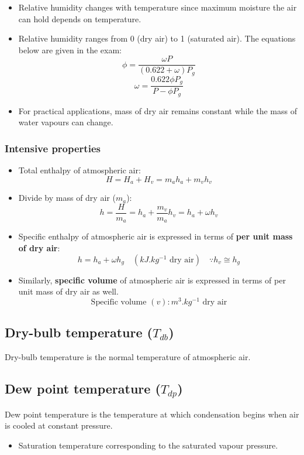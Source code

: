 \documentclass[11pt]{article}
\begin{document}
\begin{itemize}
\item Relative humidity changes with temperature since maximum moisture the air can hold depends on temperature.
\item Relative humidity ranges from 0 (dry air) to 1 (saturated air). The equations below are given in the exam:
\[\phi = \frac{\omega P}{(0.622 + \omega) P_g}\]
\[\omega = \frac{0.622 \phi P_g}{P - \phi P_g}\]
\item For practical applications, mass of dry air remains constant while the mass of water vapours can change.
\end{itemize}
\subsubsection{Intensive properties}
\label{sec:orgef16a56}
\begin{itemize}
\item Total enthalpy of atmospheric air:
\[H = H_a + H_v = m_a h_a + m_v h_v\]
\item Divide by mass of dry air (\(m_a\)):
\[h = \frac{H}{m_a} = h_a + \frac{m_v}{m_a} h_v = h_a + \omega h_v\]
\item Specific enthalpy of atmospheric air is expressed in terms of \textbf{per unit mass of dry air}:
\[h = h_a + \omega h_g \quad (\unit{kJ.kg^{-1}} \text{ dry air}) \quad \because h_v \cong h_g\]
\item Similarly, \textbf{specific volume} of atmospheric air is expressed in terms of per unit mass of dry air as well.
\[\text{Specific volume } (v): \unit{m^3.kg^{-1}} \text{ dry air}\]
\end{itemize}
\subsection{Dry-bulb temperature (\(T_{db}\))}
\label{sec:org8bbe5cf}
Dry-bulb temperature is the normal temperature of atmospheric air.
\subsection{Dew point temperature (\(T_{dp}\))}
\label{sec:org3733a7c}
Dew point temperature is the temperature at which condensation begins when air is cooled at constant pressure.
\begin{itemize}
\item Saturation temperature corresponding to the saturated vapour pressure.
\end{itemize}
\end{document}
